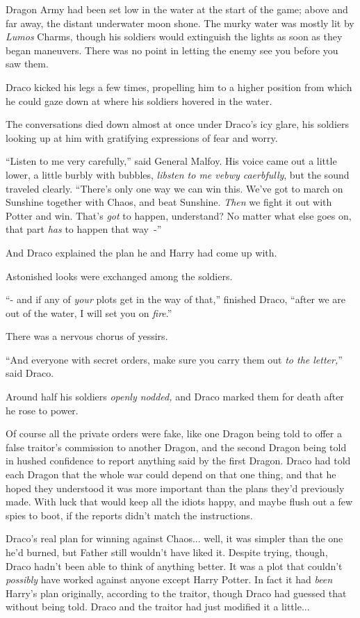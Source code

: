 Dragon Army had been set low in the water at the start of the game; above and far away, the distant underwater moon shone. The murky water was mostly lit by \emph{Lumos} Charms, though his soldiers would extinguish the lights as soon as they began maneuvers. There was no point in letting the enemy see you before you saw them.

Draco kicked his legs a few times, propelling him to a higher position from which he could gaze down at where his soldiers hovered in the water.

The conversations died down almost at once under Draco's icy glare, his soldiers looking up at him with gratifying expressions of fear and worry.

``Listen to me very carefully,'' said General Malfoy. His voice came out a little lower, a little burbly with bubbles, \emph{libsten to me vebwy caerbfully}, but the sound traveled clearly. ``There's only one way we can win this. We've got to march on Sunshine together with Chaos, and beat Sunshine. \emph{Then} we fight it out with Potter and win. That's \emph{got} to happen, understand? No matter what else goes on, that part \emph{has} to happen that way~-''

And Draco explained the plan he and Harry had come up with.

Astonished looks were exchanged among the soldiers.

``- and if any of \emph{your} plots get in the way of that,'' finished Draco, ``after we are out of the water, I will set you on \emph{fire}.''

There was a nervous chorus of yessirs.

``And everyone with secret orders, make sure you carry them out \emph{to the letter,}'' said Draco.

Around half his soldiers \emph{openly nodded,} and Draco marked them for death after he rose to power.

Of course all the private orders were fake, like one Dragon being told to offer a false traitor's commission to another Dragon, and the second Dragon being told in hushed confidence to report anything said by the first Dragon. Draco had told each Dragon that the whole war could depend on that one thing, and that he hoped they understood it was more important than the plans they'd previously made. With luck that would keep all the idiots happy, and maybe flush out a few spies to boot, if the reports didn't match the instructions.

Draco's real plan for winning against Chaos... well, it was simpler than the one he'd burned, but Father still wouldn't have liked it. Despite trying, though, Draco hadn't been able to think of anything better. It was a plot that couldn't \emph{possibly} have worked against anyone except Harry Potter. In fact it had \emph{been} Harry's plan originally, according to the traitor, though Draco had guessed that without being told. Draco and the traitor had just modified it a little...

